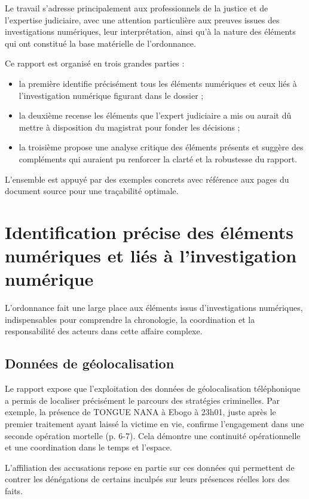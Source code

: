 \documentclass[12pt,a4paper]{article}
\begin{document}
	Le travail s'adresse principalement aux professionnels de la justice et de l'expertise judiciaire, avec une attention particulière aux preuves issues des investigations numériques, leur interprétation, ainsi qu'à la nature des éléments qui ont constitué la base matérielle de l'ordonnance.
	
	Ce rapport est organisé en trois grandes parties : 
	\begin{itemize}[leftmargin=*]
		\item la première identifie précisément tous les éléments numériques et ceux liés à l'investigation numérique figurant dans le dossier ;
		\item la deuxième recense les éléments que l'expert judiciaire a mis ou aurait dû mettre à disposition du magistrat pour fonder les décisions ;
		\item la troisième propose une analyse critique des éléments présents et suggère des compléments qui auraient pu renforcer la clarté et la robustesse du rapport.
	\end{itemize}
	
	L'ensemble est appuyé par des exemples concrets avec référence aux pages du document source pour une traçabilité optimale.
	
	\section{Identification précise des éléments numériques et liés à l'investigation numérique}
	
	L'ordonnance fait une large place aux éléments issus d'investigations numériques, indispensables pour comprendre la chronologie, la coordination et la responsabilité des acteurs dans cette affaire complexe.
	
	\subsection{Données de géolocalisation}
	
	Le rapport expose que l'exploitation des données de géolocalisation téléphonique a permis de localiser précisément le parcours des stratégies criminelles. Par exemple, la présence de TONGUE NANA à Ebogo à 23h01, juste après le premier traitement ayant laissé la victime en vie, confirme l'engagement dans une seconde opération mortelle (p. 6-7). Cela démontre une continuité opérationnelle et une coordination dans le temps et l'espace.
	
	L'affiliation des accusations repose en partie sur ces données qui permettent de contrer les dénégations de certains inculpés sur leurs présences réelles lors des faits.
	
\end{document}

